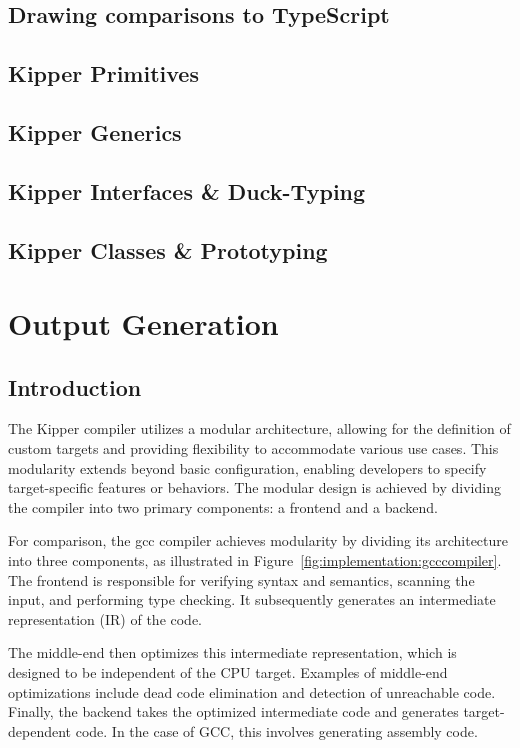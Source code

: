 \subsection{Drawing comparisons to TypeScript}

\subsection{Kipper Primitives}

\subsection{Kipper Generics}

\subsection{Kipper Interfaces \& Duck-Typing}

\subsection{Kipper Classes \& Prototyping}

\section{Output Generation}
\label{sec:output-generation}

\subsection{Introduction}

The Kipper compiler utilizes a modular architecture, allowing for the definition of custom targets and providing flexibility to accommodate various use cases. This modularity extends beyond basic configuration, enabling developers to specify target-specific features or behaviors. The modular design is achieved by dividing the compiler into two primary components: a frontend and a backend.

For comparison, the \acrshort{gcc} compiler achieves modularity by dividing its architecture into three components, as illustrated in Figure~\ref{fig:implementation:gcccompiler}. The frontend is responsible for verifying syntax and semantics, scanning the input, and performing type checking. It subsequently generates an intermediate representation (IR) of the code.

The middle-end then optimizes this intermediate representation, which is designed to be independent of the CPU target. Examples of middle-end optimizations include dead code elimination and detection of unreachable code. Finally, the backend takes the optimized intermediate code and generates target-dependent code. In the case of GCC, this involves generating assembly code.

